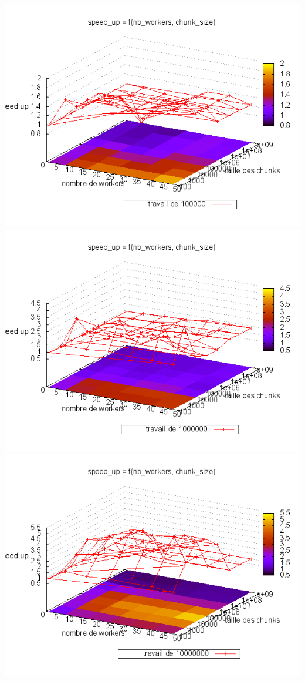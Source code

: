 \documentclass[oneside,10pt]{article}
\begin{document}
\includegraphics[scale=0.5]{travail_100000.png}
\includegraphics[scale=0.5]{travail_1000000.png}
\includegraphics[scale=0.5]{travail_10000000.png}
\end{document}
